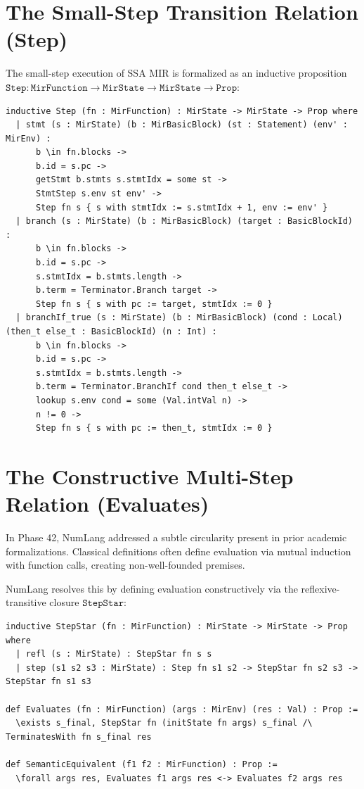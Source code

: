 \section{The Small-Step Transition Relation (Step)}
\label{sec:lean_semantics:step}

The small-step execution of SSA MIR is formalized as an inductive proposition $\mathtt{Step} : \mathtt{MirFunction} \to \mathtt{MirState} \to \mathtt{MirState} \to \mathtt{Prop}$:

\begin{lstlisting}[language=Lean4, caption={The Step relation in Lean 4.}]
inductive Step (fn : MirFunction) : MirState -> MirState -> Prop where
  | stmt (s : MirState) (b : MirBasicBlock) (st : Statement) (env' : MirEnv) :
      b \in fn.blocks ->
      b.id = s.pc ->
      getStmt b.stmts s.stmtIdx = some st ->
      StmtStep s.env st env' ->
      Step fn s { s with stmtIdx := s.stmtIdx + 1, env := env' }
  | branch (s : MirState) (b : MirBasicBlock) (target : BasicBlockId) :
      b \in fn.blocks ->
      b.id = s.pc ->
      s.stmtIdx = b.stmts.length ->
      b.term = Terminator.Branch target ->
      Step fn s { s with pc := target, stmtIdx := 0 }
  | branchIf_true (s : MirState) (b : MirBasicBlock) (cond : Local) (then_t else_t : BasicBlockId) (n : Int) :
      b \in fn.blocks ->
      b.id = s.pc ->
      s.stmtIdx = b.stmts.length ->
      b.term = Terminator.BranchIf cond then_t else_t ->
      lookup s.env cond = some (Val.intVal n) ->
      n != 0 ->
      Step fn s { s with pc := then_t, stmtIdx := 0 }
\end{lstlisting}

\section{The Constructive Multi-Step Relation (Evaluates)}
\label{sec:lean_semantics:evaluates}

In Phase 42, NumLang addressed a subtle circularity present in prior academic formalizations. Classical definitions often define evaluation via mutual induction with function calls, creating non-well-founded premises.

NumLang resolves this by defining evaluation constructively via the reflexive-transitive closure $\mathtt{StepStar}$:

\begin{lstlisting}[language=Lean4, caption={Evaluates and SemanticEquivalence in Lean 4.}]
inductive StepStar (fn : MirFunction) : MirState -> MirState -> Prop where
  | refl (s : MirState) : StepStar fn s s
  | step (s1 s2 s3 : MirState) : Step fn s1 s2 -> StepStar fn s2 s3 -> StepStar fn s1 s3

def Evaluates (fn : MirFunction) (args : MirEnv) (res : Val) : Prop :=
  \exists s_final, StepStar fn (initState fn args) s_final /\ TerminatesWith fn s_final res

def SemanticEquivalent (f1 f2 : MirFunction) : Prop :=
  \forall args res, Evaluates f1 args res <-> Evaluates f2 args res
\end{lstlisting}

